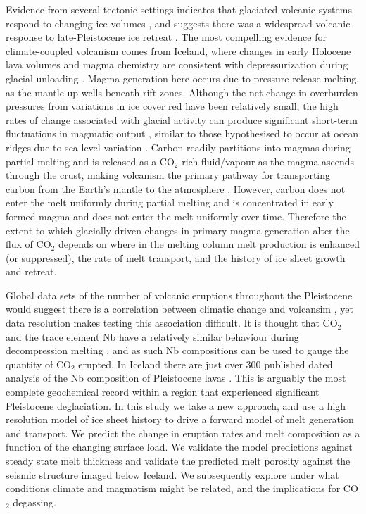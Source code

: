 \documentclass[draft,linenumbers]{agujournal2018}
\begin{document}
Evidence from several tectonic settings indicates that glaciated volcanic systems respond to changing ice volumes \citep{sigvaldason-etal-1992,jull-1996,maclennan-etal-2002,glazner-etal-1999,jellinek-etal-2004,rawson-etal-2016}, and suggests there was a widespread volcanic response to late-Pleistocene ice retreat \citep{huybers-2009}. The most compelling evidence for climate-coupled volcanism comes from Iceland, where changes in early Holocene lava volumes and magma chemistry are consistent with depressurization during glacial unloading \citep{jull-1996,maclennan-etal-2002,sinton-etal-2005}. Magma generation here occurs due to pressure-release melting, as the mantle up-wells beneath rift zones. Although the net change in overburden pressures from variations in ice cover red have been relatively small, the high rates of change associated with glacial activity can produce significant short-term fluctuations in magmatic output \citep{jull-1996,pagli-2008,schmidt-etal-2013}, similar to those hypothesised to occur at ocean ridges due to sea-level variation \citep{huybers-2009,lund-2011,crowley-etal-2015,burley-2015}. Carbon readily partitions into magmas during partial melting \citep{rosenthal-etal-2015} and is released as a CO$_{2}$ rich fluid/vapour as the magma ascends through the crust, making volcanism the primary pathway for transporting carbon from the Earth's mantle to the atmosphere \citep{dasgupta-2010}. However, carbon does not enter the melt uniformly during partial melting and is concentrated in early formed magma and does not enter the melt uniformly over time. Therefore the extent to which glacially driven changes in primary magma generation alter the flux of CO$_{2}$ depends on where in the melting column melt production is enhanced (or suppressed), the rate of melt transport, and the history of ice sheet growth and retreat.

Global data sets of the number of volcanic eruptions throughout the Pleistocene would suggest there is a correlation between climatic change and volcansim \citep{huybers-2009}, yet data resolution makes testing this association difficult. It is thought that CO$_2$ and the trace element Nb have a relatively similar behaviour during decompression melting \citep{saal-etal-2002}, and as such Nb compositions can be used to gauge the quantity of CO$_2$ erupted. In Iceland there are just over 300 published dated analysis of the Nb composition of Pleistocene lavas \citep{gee-etal-1998,eason-etal-2015}. This is arguably the most complete geochemical record within a region that experienced significant Pleistocene deglaciation. In this study we take a new approach, and use a high resolution model of ice sheet history to drive a forward model of melt generation and transport. We predict the change in eruption rates and melt composition as a function of the changing surface load. We validate the model predictions against steady state melt thickness and validate the predicted melt porosity against the seismic structure imaged below Iceland. We subsequently explore under what conditions climate and magmatism might be related, and the implications for CO$_{2}$ degassing.
\end{document}
